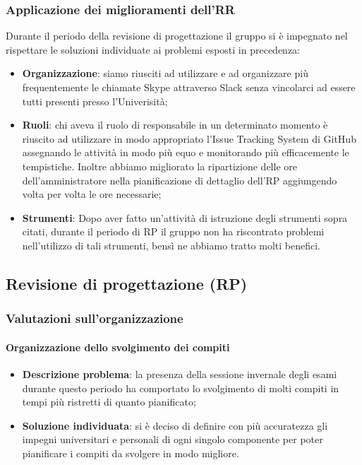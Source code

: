 		\subsubsection{Applicazione dei miglioramenti dell'RR}
			Durante il periodo della revisione di progettazione il gruppo si è impegnato nel rispettare le soluzioni individuate ai problemi esposti in precedenza:
			\begin{itemize}
				\item \textbf{Organizzazione}: siamo riusciti ad utilizzare e ad organizzare  più frequentemente le chiamate Skype attraverso Slack senza vincolarci ad essere tutti presenti presso l'Univerisità;
				\item \textbf{Ruoli}: chi aveva il ruolo di responsabile in un determinato momento è riuscito ad utilizzare in modo appropriato l'Issue Tracking System di GitHub assegnando le attività in modo più equo e monitorando più efficacemente le tempistiche. Inoltre abbiamo migliorato la ripartizione delle ore dell'amministratore nella pianificazione di dettaglio dell'RP aggiungendo volta per volta le ore necessarie;
				\item \textbf{Strumenti}: Dopo aver fatto un'attività di istruzione degli strumenti sopra citati, durante il periodo di RP il gruppo non ha riscontrato problemi nell'utilizzo di tali strumenti, bensì ne abbiamo tratto molti benefici.
			\end{itemize}
	\subsection{Revisione di progettazione (RP)}
		\subsubsection{Valutazioni sull'organizzazione}
			\paragraph{Organizzazione dello svolgimento dei compiti}
				\begin{itemize}
					\item \textbf{Descrizione problema}: la presenza della sessione invernale degli esami durante questo periodo ha comportato lo svolgimento di molti compiti in tempi più ristretti di quanto pianificato;
					\item \textbf{Soluzione individuata}: si è deciso di definire con più accuratezza gli impegni universitari e personali di ogni singolo componente per poter pianificare i compiti da svolgere in modo migliore.
				\end{itemize}
